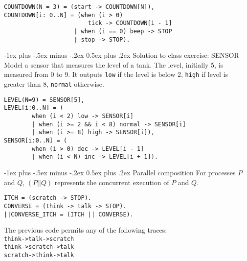 \documentclass[10pt,landscape]{article}
\makeatletter
\renewcommand{\section}{\@startsection{section}{1}{0mm}%
                                {-1ex plus -.5ex minus -.2ex}%
                                {0.5ex plus .2ex}%
                                {\normalfont\large\bfseries}}
\makeatother
\begin{document}
\begin{multicols}{3}
\begin{verbatim}
COUNTDOWN(N = 3) = (start -> COUNTDOWN[N]),
COUNTDOWN[i: 0..N] = (when (i > 0)
                        tick -> COUNTDOWN[i - 1]
                    | when (i == 0) beep -> STOP
                    | stop -> STOP).
\end{verbatim}
\begin{center}
\end{center}
\section{Solution to class exercise: SENSOR}
Model a sensor that measures the level of a tank. The level, initially 5, is measured from 0 to 9. It outputs \texttt{low} if the level is below 2, \texttt{high} if level is greater than 8, \texttt{normal} otherwise.
\begin{verbatim}
LEVEL(N=9) = SENSOR[5],
LEVEL[i:0..N] = (
        when (i < 2) low -> SENSOR[i]
        | when (i >= 2 && i < 8) normal -> SENSOR[i]
        | when (i >= 8) high -> SENSOR[i]),
SENSOR[i:0..N] = (
        when (i > 0) dec -> LEVEL[i - 1]
        | when (i < N) inc -> LEVEL[i + 1]).
\end{verbatim}
\section{Parallel composition}
For processes $P$ and $Q$, $(P||Q)$ represents the concurrent execution of $P$ and $Q$.
\begin{verbatim}
ITCH = (scratch -> STOP).
CONVERSE = (think -> talk -> STOP).
||CONVERSE_ITCH = (ITCH || CONVERSE).
\end{verbatim}
The previous code permits any of the following traces:\\
\texttt{think->talk->scratch}\\
\texttt{think->scratch->talk}\\
\texttt{scratch->think->talk}

\end{multicols}
\end{document}
